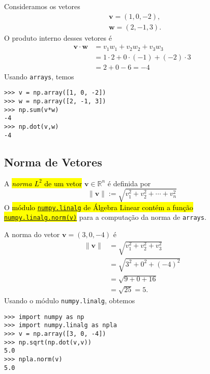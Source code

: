 \begin{ex}
  Consideramos os vetores
  \begin{align}
    &\pmb{v} = (1, 0, -2),\\
    &\pmb{w} = (2, -1, 3).
  \end{align}
  O produto interno desses vetores é
  \begin{subequations}
    \begin{align}
    \pmb{v}\cdot\pmb{w} &= v_1w_1 + v_2w_2 + v_3w_3\\
                        &= 1\cdot 2 + 0\cdot(-1) + (-2)\cdot 3\\
                        &= 2 + 0 -6 = -4
    \end{align}
  \end{subequations}
  Usando \lstinline+arrays+, temos
\begin{lstlisting}
>>> v = np.array([1, 0, -2])
>>> w = np.array([2, -1, 3])
>>> np.sum(v*w)
-4
>>> np.dot(v,w)
-4
\end{lstlisting}
\end{ex}

\subsection{Norma de Vetores}

A \hl{\emph{norma} $L^2$ de um vetor} $\pmb{v}\in\mathbb{R}^n$ é definida por
\begin{equation}
  \|\pmb{v}\| := \sqrt{v_1^2+v_2^2+\cdots+v_n^2}
\end{equation}
O \hl{módulo {\href{https://numpy.org/doc/stable/reference/routines.linalg.html}{\lstinline+numpy.linalg+}} de Álgebra Linear contém a função {\href{https://numpy.org/doc/stable/reference/generated/numpy.linalg.norm.html}{\lstinline+numpy.linalg.norm(v)+}}} para a computação da norma de \lstinline+arrays+.

\begin{ex}
  A norma do vetor $\pmb{v} = (3, 0, -4)$ é
  \begin{subequations}
    \begin{align}
      \|\pmb{v}\| &= \sqrt{v_1^2 + v_2^2 + v_3^2}\\
                  &= \sqrt{3^2 + 0^2 + (-4)^2}\\
                  &= \sqrt{9 + 0 + 16}\\
                  &= \sqrt{25} = 5.
    \end{align}
  \end{subequations}
  Usando o módulo \lstinline+numpy.linalg+, obtemos
\begin{lstlisting}
>>> import numpy as np
>>> import numpy.linalg as npla
>>> v = np.array([3, 0, -4])
>>> np.sqrt(np.dot(v,v))
5.0
>>> npla.norm(v)
5.0
\end{lstlisting}
\end{ex}

